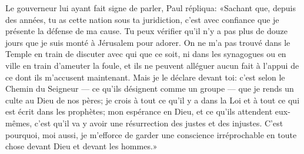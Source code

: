 Le gouverneur lui ayant fait signe de parler, Paul répliqua:
	«Sachant que, depuis des années, tu as cette nation sous ta juridiction,
	c’est avec confiance que je présente la défense de ma cause.
	Tu peux vérifier qu’il n’y a pas plus de douze jours
		que je suis monté à Jérusalem pour adorer.
On ne m’a pas trouvé dans le Temple en train de discuter avec qui que ce soit,
	ni dans les synagogues ou en ville en train d’ameuter la foule,
	et ils ne peuvent alléguer aucun fait à l’appui de ce dont ils m’accusent maintenant.
Mais je le déclare devant toi: c’est selon le Chemin du Seigneur
	--- ce qu’ils désignent comme un groupe ---
	que je rends un culte au Dieu de nos pères;
	je crois à tout ce qu’il y a dans la Loi
	et à tout ce qui est écrit dans les prophètes;
	mon espérance en Dieu, et ce qu’ils attendent eux-mêmes,
	c’est qu’il va y avoir une résurrection des justes et des injustes.
C’est pourquoi, moi aussi,
	je m’efforce de garder une conscience irréprochable en toute chose
	devant Dieu et devant les hommes.»
